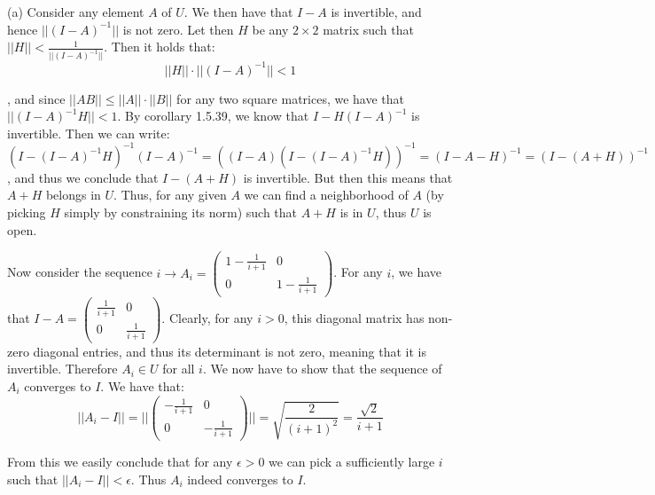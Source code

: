 \begin{solution}

    (a) Consider any element $A$ of $U$. We then have that $I - A$ is invertible, and hence $\lvert \lvert (I - A)^{-1} \rvert \rvert$ is not zero. Let then $H$ be any $2 \times 2$ matrix such that $\lvert \lvert H \rvert \rvert < \frac{1}{\lvert \lvert (I-A)^{-1} \rvert \rvert}$. Then it holds that:
    $$\lvert \lvert H \rvert \rvert \cdot \lvert \lvert (I-A)^{-1} \rvert \rvert < 1$$

    , and since $\lvert \lvert A B \rvert \rvert \leq \lvert \lvert A \rvert \rvert \cdot \lvert \lvert B \rvert \rvert$ for any two square matrices, we have that $\lvert \lvert (I-A)^{-1}H \rvert \rvert < 1$. By corollary 1.5.39, we know that $I - H(I-A)^{-1}$ is invertible. Then we can write:
    $$(I - (I-A)^{-1}H)^{-1}(I-A)^{-1} = ((I-A)(I - (I-A)^{-1}H))^{-1} = (I-A - H)^{-1} = (I-(A+H))^{-1}$$
    , and thus we conclude that $I - (A+H)$ is invertible. But then this means that $A+H$ belongs in $U$. Thus, for any given $A$ we can find a neighborhood of $A$ (by picking $H$ simply by constraining its norm) such that $A + H$ is in $U$, thus $U$ is open.

    Now consider the sequence $i \rightarrow A_i = \begin{pmatrix}
        1 - \frac{1}{i+1} & 0 \\ 0 & 1 - \frac{1}{i+1}
    \end{pmatrix}$. For any $i$, we have that $I - A = \begin{pmatrix}
        \frac{1}{i + 1} & 0 \\ 0 & \frac{1}{i + 1}
    \end{pmatrix}$. Clearly, for any $i > 0$, this diagonal matrix has non-zero diagonal entries, and thus its determinant is not zero, meaning that it is invertible. Therefore $A_i \in U$ for all $i$. We now have to show that the sequence of $A_i$ converges to $I$. We have that:
    $$\lvert \lvert A_i - I \rvert \rvert = \Biggl\lvert \Biggl\lvert \begin{pmatrix}
        -\frac{1}{i+1} & 0 \\ 0 & -\frac{1}{i+1}
    \end{pmatrix} \Biggr\rvert \Biggr\rvert = \sqrt{\frac{2}{(i+1)^2}} = \frac{\sqrt{2}}{i+1}$$

    From this we easily conclude that for any $\epsilon > 0$ we can pick a sufficiently large $i$ such that $\lvert \lvert A_i - I \rvert \rvert < \epsilon$. Thus $A_i$ indeed converges to $I$.


\end{solution}
